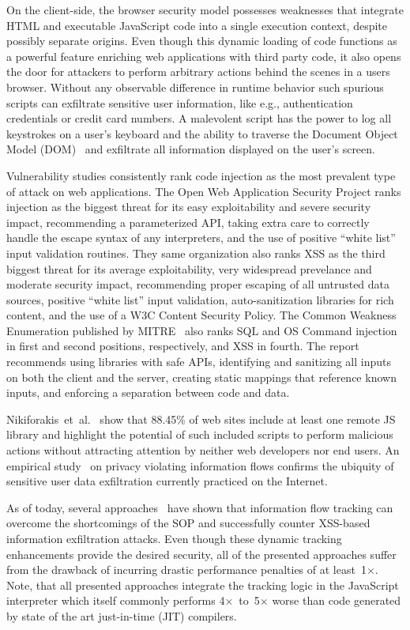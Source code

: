 On the client-side, the browser security model possesses weaknesses that integrate HTML and executable JavaScript code into a single execution context, despite possibly separate origins.
Even though this dynamic loading of code functions as a powerful feature enriching web applications with third party code, it also opens the door for attackers to perform arbitrary actions behind the scenes in a users browser.
Without any observable difference in runtime behavior such spurious scripts can exfiltrate sensitive user information, like e.g., authentication credentials or credit card numbers.
A malevolent script has the power to log all keystrokes on a user's keyboard and the ability to traverse the Document Object Model (DOM)~\cite{dom} and exfiltrate all information displayed on the user's screen.

Vulnerability studies consistently rank code injection as the most prevalent type of attack on web applications.
The Open Web Application Security Project\cite{owasp} ranks injection as the biggest threat for its easy exploitability and severe security impact, recommending a parameterized API, taking extra care to correctly handle the escape syntax of any interpreters, and the use of positive ``white list'' input validation routines.
They same organization also ranks XSS as the third biggest threat for its average exploitability, very widespread prevelance and moderate security impact, recommending proper escaping of all untrusted data sources, positive ``white list'' input validation, auto-sanitization libraries for rich content, and the use of a W3C Content Security Policy.
The Common Weakness Enumeration published by MITRE~\cite{cwe} also ranks SQL and OS Command injection in first and second positions, respectively, and XSS in fourth.
The report recommends using libraries with safe APIs, identifying and sanitizing all inputs on both the client and the server, creating static mappings that reference known inputs, and enforcing a separation between code and data.

Nikiforakis~et~al.~\cite{nikiforakis.etal+12} show that 88.45\% of web sites include at least one remote JS library and highlight the potential of such included scripts to perform malicious actions without attracting attention by neither web developers nor end users.
An empirical study~\cite{jang.etal+10} on privacy violating information flows confirms the ubiquity of sensitive user data exfiltration currently practiced on the Internet.

As of today, several approaches~\cite{vogt.etal+07,just.etal+11,groef.etal+12,kerschbaumer.etal+13} have shown that information flow tracking can overcome the shortcomings of the SOP and successfully counter XSS-based information exfiltration attacks.
Even though these dynamic tracking enhancements provide the desired security, all of the presented approaches suffer from the drawback of incurring drastic performance penalties of at least~1$\times$.
Note, that all presented approaches integrate the tracking logic in the JavaScript interpreter which itself commonly performs 4$\times$~to~5$\times$ worse than code generated by state of the art just-in-time (JIT) compilers.

